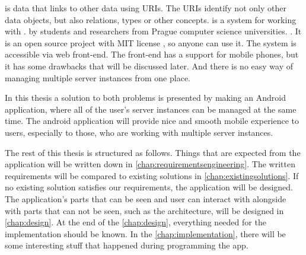 \ld{} is data that links to other data using URIs.
The URIs identify not only other data objects, but also relations, types or other concepts.
\etl{} is a system for working with \ld{}.
 by students and researchers from Prague computer science universities.
.
It is an open source project \cite{etl} with MIT license , so anyone can use it.
The system is accessible via web front-end.
The front-end has a support for mobile phones, but it has some drawbacks that will be discussed later.
And there is no easy way of managing multiple server instances from one place.

In this thesis a solution to both problems is presented by making an Android application, where all of the user's \etl{} server instances can be managed at the same time.
The android application will provide nice and smooth mobile experience to \etl{} users, especially to those, who are working with multiple server instances.

The rest of this thesis is structured as follows.
Things that are expected from the application will be written down in \autoref{chap:requirementsengineering}.
The written requirements will be compared to existing solutions in \autoref{chap:existingsolutions}.
If no existing solution satisfies our requirements, the application will be designed.
The application's parts that can be seen and user can interact with alongside with parts that can not be seen, such as the architecture, will be designed in \autoref{chap:design}.
At the end of the \autoref{chap:design}, everything needed for the implementation should be known.
In the \autoref{chap:implementation}, there will be some interesting stuff that happened during programming the app.